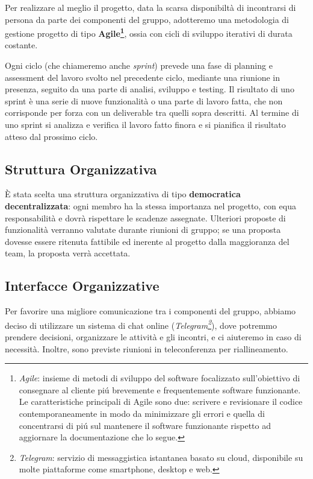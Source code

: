 \documentclass{article}
\begin{document}
  Per realizzare al meglio il progetto, data la scarsa disponibiltà di
  incontrarsi di persona da parte dei componenti del gruppo, adotteremo una metodologia di gestione progetto di tipo \textbf{Agile\footnote{\emph{Agile}:
    insieme di metodi di sviluppo del software focalizzato sull'obiettivo
    di consegnare al cliente piú brevemente e frequentemente software
    funzionante. Le caratteristiche principali di Agile sono due: scrivere
    e revisionare il codice contemporaneamente in modo da minimizzare gli
    errori e quella di concentrarsi di piú sul mantenere il software
    funzionante rispetto ad aggiornare la documentazione che lo segue.}},
  ossia con cicli di sviluppo iterativi di durata costante.
  
  Ogni ciclo (che chiameremo anche \emph{sprint}) prevede una fase di
  planning e assessment del lavoro svolto nel precedente ciclo, mediante
  una riunione in presenza, seguito da una parte di analisi, sviluppo e
  testing. Il risultato di uno sprint è una serie di nuove funzionalità o
  una parte di lavoro fatta, che non corrisponde per forza con un
  deliverable tra quelli sopra descritti. Al termine di uno sprint si
  analizza e verifica il lavoro fatto finora e si pianifica il risultato
  atteso dal prossimo ciclo.
  
  \subsection{Struttura Organizzativa}
  
  È stata scelta una struttura organizzativa di tipo \textbf{democratica
  decentralizzata}: ogni membro ha la stessa importanza nel progetto, con
  equa responsabilità e dovrà rispettare le scadenze assegnate. Ulteriori proposte di funzionalità verranno valutate durante riunioni di gruppo; se una proposta dovesse essere ritenuta fattibile ed inerente al progetto dalla maggioranza del team, la proposta verrà accettata.
  
  \subsection{Interfacce Organizzative}
  
  Per favorire una migliore comunicazione tra i componenti del gruppo,
  abbiamo deciso di utilizzare un sistema di chat online
  (\emph{Telegram\footnote{\emph{Telegram}: servizio di messaggistica
    istantanea basato su cloud, disponibile su molte piattaforme come
    smartphone, desktop e web.}}), dove potremmo
  prendere decisioni, organizzare le attività e gli incontri, e ci
  aiuteremo in caso di necessità. Inoltre, sono previste riunioni in
  teleconferenza per riallineamento.
  
\end{document}
